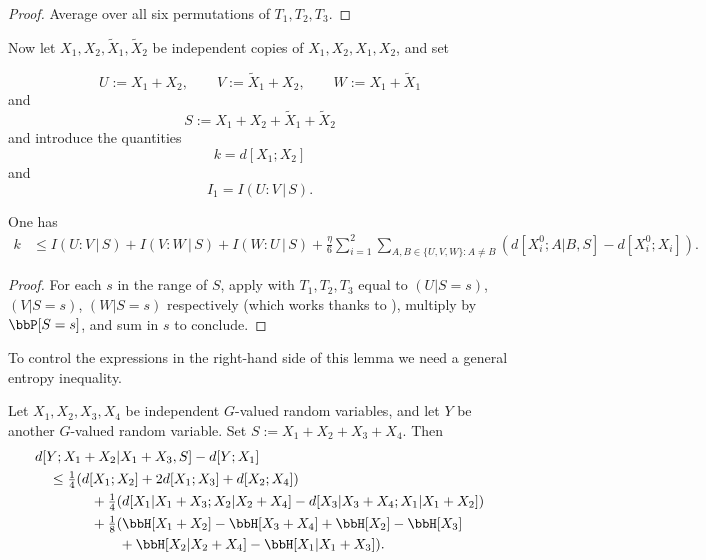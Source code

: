 \begin{proof}
\leanok
Average  over all six permutations of $T_1,T_2,T_3$.
\end{proof}

Now let $X_1, X_2, \tilde X_1, \tilde X_2$ be independent copies of $X_1, X_2, X_1, X_2$, and set

\[U := X_1 + X_2, \qquad V := \tilde X_1 + X_2, \qquad W := X_1 + \tilde X_1\] and
\[  S := X_1 + X_2 + \tilde X_1 + \tilde X_2\]
and introduce the quantities
$$ k = d[X_1;X_2]$$
and
$$ I_1 = I(U : V \, | \, S).$$

\begin{lemma}\label{averaged-construct-good}\leanok
  One has
  \begin{align*}  k & \leq I(U : V \, | \, S) + I(V : W \, | \,S) + I(W : U \, | \, S) + \frac{\eta}{6}  \sum_{i=1}^2 \sum_{A,B \in \{U,V,W\}: A \neq B} (d[X^0_i;A|B,S] - d[X^0_i; X_i]).
    \end{align*}
\end{lemma}

\begin{proof}\leanok  For each $s$ in the range of $S$, apply  with $T_1,T_2,T_3$ equal to $(U|S=s)$, $(V|S=s)$, $(W|S=s)$ respectively (which works thanks to ), multiply by $\bbP[S=s]$, and sum in $s$ to conclude.
\end{proof}

To control the expressions in the right-hand side of this lemma we need a general entropy inequality.

\begin{lemma}\label{gen-ineq} \leanok
Let $X_1, X_2, X_3, X_4$ be independent $G$-valued random variables, and let $Y$ be another $G$-valued random variable.  Set $S := X_1+X_2+X_3+X_4$. Then
  \begin{align*}
    &  d[Y; X_1+X_2|X_1 + X_3, S] - d[Y; X_1] \\
    &\quad \leq \tfrac{1}{4} (d[X_1;X_2] + 2d[X_1;X_3] + d[X_2;X_4])\\
    &\qquad \qquad + \tfrac{1}{4} (d[X_1|X_1+X_3;X_2|X_2+X_4] - d[X_3|X_3+X_4; X_1|X_1+X_2])\\
    &\qquad \qquad + \tfrac{1}{8} (\bbH[X_1+X_2] - \bbH[X_3+X_4] + \bbH[X_2] - \bbH[X_3]\\
    &\qquad \qquad \qquad + \bbH[X_2|X_2+X_4] - \bbH[X_1|X_1+X_3]).
\end{align*}
\end{lemma}

